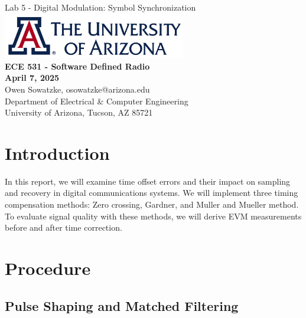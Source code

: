 \documentclass{article}
\begin{document}
\begin{titlepage}
	\centering
	{\huge Lab 5 - Digital Modulation: Symbol Synchronization}\\[0.25 in]
	\includegraphics[width=0.6\textwidth]{ua_logo.png}\\[0.25 in]
	{\large \textbf{ECE 531 - Software Defined Radio\\[0.25 in]
	April 7, 2025\\[0.25 in]}}
	{\large Owen Sowatzke, osowatzke@arizona.edu\\[0.05 in]
	Department of Electrical \& Computer Engineering\\[0.05 in]
	University of Arizona, Tucson, AZ 85721\\[0.5 in]}
	\hypersetup{linkcolor=navy-blue}
	\noindent\hrulefill
	\tableofcontents
	\noindent\hrulefill
\end{titlepage}


\section{Introduction}
In this report, we will examine time offset errors and their impact on sampling and recovery in digital communications systems. We will implement three timing compensation methods: Zero crossing, Gardner, and Muller and Mueller method. To evaluate signal quality with these methods, we will derive EVM measurements before and after time correction. 


\section{Procedure}

\subsection{Pulse Shaping and Matched Filtering}
\end{document}
